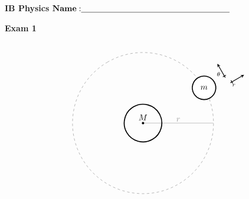 \documentclass{article}
\begin{document}

\doublespacing
\textbf{IB Physics }                        %
 \hfill                             %
${\bf Name: } \underline{\hspace{2.5in}}$

\begin{centering}
\vspace{1cm}
\textbf{Exam 1}\\
\end{centering}

\vspace{1cm}



$$\begin{tikzpicture}[scale=1]
     	
	
	
\draw [color=gray!80] (0,0)--(3,0)
   node [midway,anchor=south,inner sep=1pt, outer sep=1pt]{$r$};


 \begin{scope}[shift={(0,0)}, scale=1,rotate=120] 
 \draw[color=gray,dashed] (0,0) circle (3cm);
  \begin{scope}[shift={(0,-4)}, scale=0.75, rotate=-90] 
	  \draw[ thick,-stealth] (0,-0.1) -- (0,0.8) node [near start,anchor=east]{\scriptsize $\theta$};  
	  \draw[thick](-0.1,0) -- (0.1,0);
	   \draw[thick](0.2,-0.4) -- (0.2,-0.6);
	    \draw[ thick,-stealth] (0.1,-0.5) -- (1,-0.5) node [near start,anchor=north]{\scriptsize $r$};  
	  \end{scope}
 \fill[black] (0,0) circle (0.5mm) node [anchor = south] {$M$};  
 
 \fill[white] (0,-3) circle (0.5cm);
 \draw[very thick] (0,-3) circle (0.5cm);
  \draw[very thick] (0,0) circle (0.8cm);
  \draw (0,-3) node {$m$};
 \end{scope}
		  
    
   \end{tikzpicture}$$
   
\end{document}
